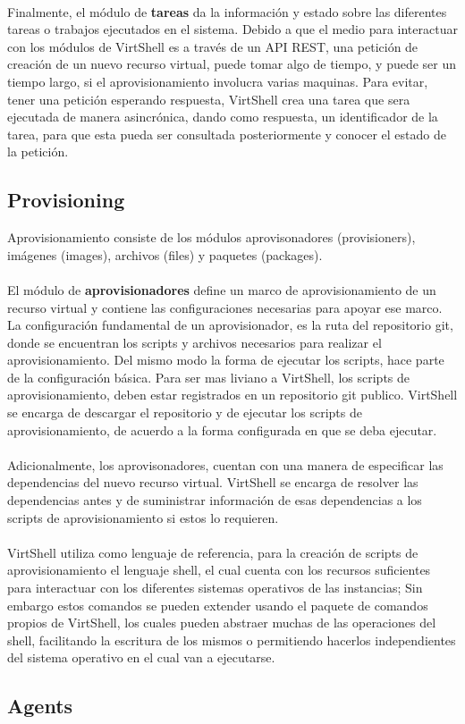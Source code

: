 \\
Finalmente, el módulo de \textbf{tareas} da la información y estado sobre las diferentes tareas o trabajos ejecutados en el sistema. Debido a que el medio para interactuar con los módulos de VirtShell es a través de un API REST, una petición de creación de un nuevo recurso virtual, puede tomar algo de tiempo, y puede ser un tiempo largo, si el aprovisionamiento involucra varias maquinas. Para evitar, tener una petición esperando respuesta, VirtShell crea una tarea que sera ejecutada de manera asincrónica, dando como respuesta, un identificador de la tarea, para que esta pueda ser consultada posteriormente y conocer el estado de la petición.


\subsection{Provisioning}
Aprovisionamiento consiste de los módulos aprovisonadores (provisioners), imágenes (images), archivos (files) y paquetes (packages).\\
\\
El módulo de \textbf{aprovisionadores} define un marco de aprovisionamiento de un recurso virtual y contiene las configuraciones necesarias para apoyar ese marco. La configuración fundamental de un aprovisionador, es la ruta del repositorio git, donde se encuentran los scripts y archivos necesarios para realizar el aprovisionamiento. Del mismo modo la forma de ejecutar los scripts, hace parte de la configuración básica. Para ser mas liviano a VirtShell, los scripts de aprovisionamiento, deben estar registrados en un repositorio git publico. VirtShell se encarga de descargar el repositorio y de ejecutar los scripts de aprovisionamiento, de acuerdo a la forma configurada en que se deba ejecutar. \\
\\
Adicionalmente, los aprovisonadores, cuentan con una manera de especificar las dependencias del nuevo recurso virtual. VirtShell se encarga de resolver las dependencias antes y de suministrar información de esas dependencias a los scripts de aprovisionamiento si estos lo requieren. \\
\\
VirtShell utiliza como lenguaje de referencia, para la creación de scripts de aprovisionamiento el lenguaje shell, el cual cuenta con los recursos suficientes para interactuar con los diferentes sistemas operativos de las instancias; Sin embargo estos comandos se pueden extender usando el paquete de comandos propios de VirtShell, los cuales pueden abstraer muchas de las operaciones del shell, facilitando la escritura de los mismos o permitiendo hacerlos independientes del sistema operativo en el cual van a ejecutarse.

\subsection{Agents}


